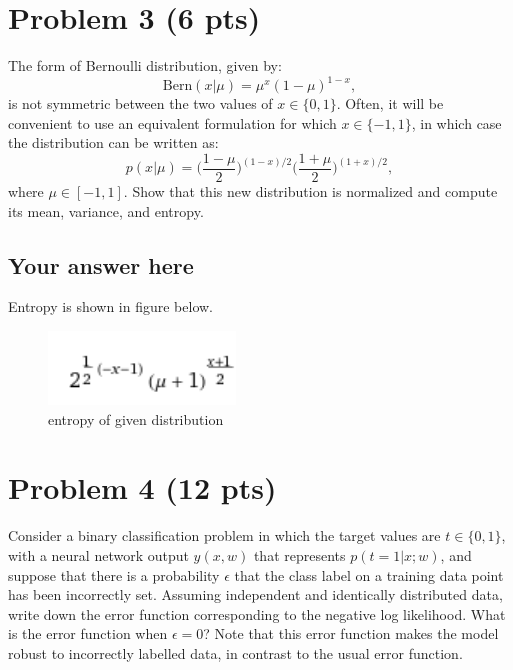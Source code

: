 \documentclass{article}
\begin{document}


\section*{Problem 3 (6 pts)}

The form of Bernoulli distribution, given by:
\begin{equation}
\textrm{Bern}(x | \mu) = \mu^x (1-\mu)^{1-x},
\nonumber
\end{equation}
is not symmetric between the two values of $x\in \{0,1\}$. Often, it will be
convenient to use an equivalent formulation for which $x \in \{-1,1\}$, in which case
the distribution can be written as:
\begin{equation}
 p(x | \mu) = \bigg(\frac{1-\mu}{2}\bigg)^{(1-x)/2}
  \bigg(\frac{1+\mu}{2}\bigg)^{(1+x)/2},
\nonumber
\end{equation}
where $\mu \in [-1,1]$. Show that this new distribution is normalized and compute
its mean, variance, and entropy.

\subsection*{Your answer here}

Entropy is shown in figure below.

\begin{figure}[h]
\centering
\includegraphics[width=.3\linewidth]{bern1.png}
\caption{entropy of given distribution}
\label{fig:llfunc}
\end{figure}

\section*{Problem 4 (12 pts)}
Consider a binary classification problem in which the target 
values are $t \in  \{0, 1\}$, with a neural 
network output $y(x, w)$ that represents $p(t = 1|x; w)$, and suppose that there is
 a probability $\epsilon$  that the class label on a training data point has been incorrectly set. 
Assuming independent and identically distributed data, write down the error function corresponding to the negative log likelihood. 
What is the error function when $\epsilon=0$? 
Note that this error function makes the model robust to incorrectly labelled data, in contrast to the usual error function.
\end{document}
